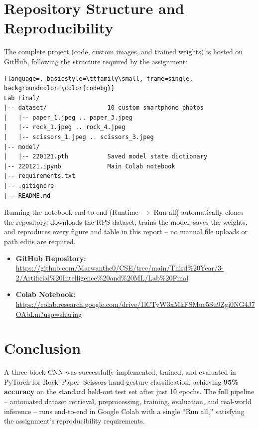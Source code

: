 \documentclass[11pt,a4paper]{article}
\begin{document}
\section{Repository Structure and Reproducibility}

The complete project (code, custom images, and trained weights) is hosted on GitHub, following the structure required by the assignment:

\begin{lstlisting}[language=, basicstyle=\ttfamily\small, frame=single, backgroundcolor=\color{codebg}]
Lab Final/
|-- dataset/                 10 custom smartphone photos
|   |-- paper_1.jpeg .. paper_3.jpeg
|   |-- rock_1.jpeg .. rock_4.jpeg
|   |-- scissors_1.jpeg .. scissors_3.jpeg
|-- model/
|   |-- 220121.pth           Saved model state dictionary
|-- 220121.ipynb             Main Colab notebook
|-- requirements.txt
|-- .gitignore
|-- README.md
\end{lstlisting}

Running the notebook end-to-end (Runtime $\to$ Run all) automatically clones the repository, downloads the RPS dataset, trains the model, saves the weights, and reproduces every figure and table in this report -- no manual file uploads or path edits are required.

\begin{itemize}[leftmargin=1.3cm]
    \item \textbf{GitHub Repository:} \url{https://github.com/Marwanthe0/CSE/tree/main/Third\%20Year/3-2/Artificial\%20Intelligence\%20and\%20ML/Lab\%20Final}
    \item \textbf{Colab Notebook:} \url{https://colab.research.google.com/drive/1lCTyW3xMkFSMuc5Su9Zgi0NG4J7OAbLm?usp=sharing}
\end{itemize}

\section{Conclusion}

A three-block CNN was successfully implemented, trained, and evaluated in PyTorch for Rock--Paper--Scissors hand gesture classification, achieving \textbf{95\% accuracy} on the standard held-out test set after just 10 epochs. The full pipeline -- automated dataset retrieval, preprocessing, training, evaluation, and real-world inference -- runs end-to-end in Google Colab with a single ``Run all,'' satisfying the assignment's reproducibility requirements.
\end{document}
